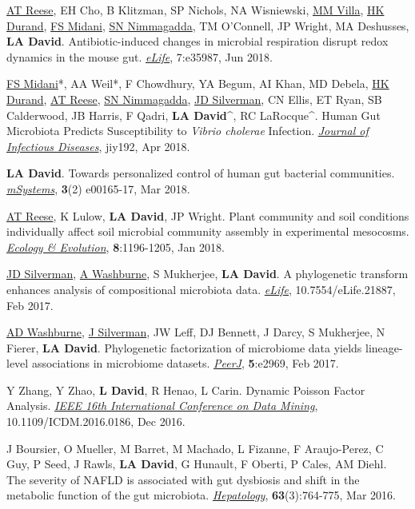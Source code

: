 \documentclass[overlapped,line,11pt]{res}
\begin{document}
\begin{resume}
\begin{revnumerate}[29]
\item {\ul{AT Reese}, EH Cho, B Klitzman, SP Nichols, NA Wisniewski,
  \ul{MM Villa}, \ul{HK Durand}, \ul{FS Midani}, \ul{SN Nimmagadda},
  TM O’Connell, JP Wright, MA Deshusses, \textbf{LA
    David}. Antibiotic-induced changes in microbial respiration
  disrupt redox dynamics in the mouse gut. \emph{\ul{eLife}},
  7:e35987, Jun 2018.  }

\item {\ul{FS Midani}*, AA Weil*, F Chowdhury, YA Begum, AI Khan, MD
  Debela, \ul{HK Durand}, \ul{AT Reese}, \ul{SN Nimmagadda}, \ul{JD
    Silverman}, CN Ellis, ET Ryan, SB Calderwood, JB Harris, F Qadri,
  \textbf{LA David}\^{}, RC LaRocque\^{}. Human Gut Microbiota
  Predicts Susceptibility to \emph{Vibrio cholerae}
  Infection. \emph{\ul{Journal of Infectious Diseases}}, jiy192, Apr
  2018.}

\item {\textbf{LA David}. Towards personalized control of human gut
  bacterial communities. \emph{\ul{mSystems}},
  \textbf{3}(2) e00165-17, Mar 2018.}

\item {\underline{AT Reese}, K Lulow, \textbf{LA David}, JP
  Wright. Plant community and soil conditions individually affect soil
  microbial community assembly in experimental
  mesocosms. \emph{\ul{Ecology \& Evolution}}, \textbf{8}:1196-1205,
  Jan 2018.}

\item {\underline{JD Silverman}, \underline{A Washburne}, S Mukherjee, \textbf{LA David}. A
  phylogenetic transform enhances analysis of compositional microbiota
  data. \emph{\underline{eLife}}, 10.7554/eLife.21887, Feb 2017.}

\item {\underline{AD Washburne}, \underline{J Silverman}, JW Leff, DJ
  Bennett, J Darcy, S Mukherjee, N Fierer, \textbf{LA
    David}. Phylogenetic factorization of microbiome data yields
  lineage-level associations in microbiome
  datasets. \emph{\underline{PeerJ}}, \textbf{5}:e2969, Feb 2017.}

\item {Y Zhang, Y Zhao, \textbf{L David}, R Henao, L Carin. Dynamic
  Poisson Factor Analysis. \emph{\ul{IEEE 16th International
      Conference on Data Mining}}, 10.1109/ICDM.2016.0186, Dec 2016.}

\item {J Boursier, O Mueller, M Barret, M Machado, L Fizanne, F
  Araujo-Perez, C Guy, P Seed, J Rawls, \textbf{LA David}, G Hunault, F
  Oberti, P Cales, AM Diehl. The severity of NAFLD is associated with
  gut dysbiosis and shift in the metabolic function of the gut
  microbiota. \emph{\underline{Hepatology}}, \textbf{63}(3):764-775, Mar 2016.}


\end{revnumerate}
\end{resume}
\end{document}
